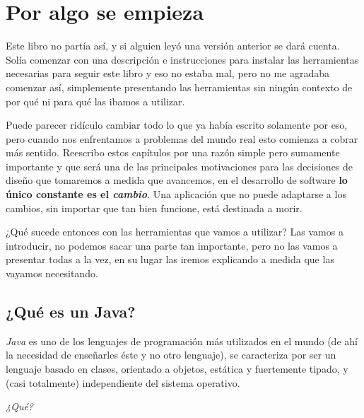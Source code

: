 \chapter{Por algo se empieza}
  Este libro no partía así, y si alguien leyó una versión anterior se dará cuenta.
  Solía comenzar con una descripción e instrucciones para instalar las herramientas necesarias para
  seguir este libro y eso no estaba mal, pero no me agradaba comenzar así, simplemente presentando
  las herramientas sin ningún contexto de por qué ni para qué las ibamos a utilizar.

  Puede parecer ridículo cambiar todo lo que ya había escrito solamente por eso, pero cuando nos 
  enfrentamos a problemas del mundo real esto comienza a cobrar más sentido.
  Reescribo estos capítulos por una razón simple pero sumamente importante y que será una de las
  principales motivaciones para las decisiones de diseño que tomaremos a medida que avancemos, en
  el desarrollo de software \textbf{lo único constante es el 
  \textit{cambio}}.\autocite{head-first-intro}
  Una aplicación que no puede adaptarse a los cambios, sin importar que tan bien funcione, está
  destinada a morir.

  ¿Qué sucede entonces con las herramientas que vamos a utilizar?
  Las vamos a introducir, no podemos sacar una parte tan importante, pero no las vamos a presentar
  todas a la vez, en su lugar las iremos explicando a medida que las vayamos necesitando.

  \section{¿Qué es un Java?}
    \textit{Java} es uno de los lenguajes de programación más utilizados en el mundo (de ahí la 
    necesidad de enseñarles éste y no otro lenguaje), se caracteriza por ser un lenguaje basado en 
    clases, orientado a objetos, estática y fuertemente tipado, y (casi totalmente) independiente del sistema 
    operativo.
    
    \begin{center}
      \textit{¿Qué?}
    \end{center}

